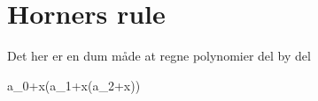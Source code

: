 \documentclass[letterpaper,10pt,danish]{sphinxmanual}
\begin{document}
\section{Horners rule}
\label{\detokenize{Algorithmer/Korrekthed:horners-rule}}
\sphinxAtStartPar
Det her er en dum måde at regne polynomier del by del

\sphinxAtStartPar
a\_0+x(a\_1+x(a\_2+x))


\section{}
\label{\detokenize{Algorithmer/Korrekthed:id1}}


\renewcommand{\indexname}{Indeks}
\printindex
\end{document}
